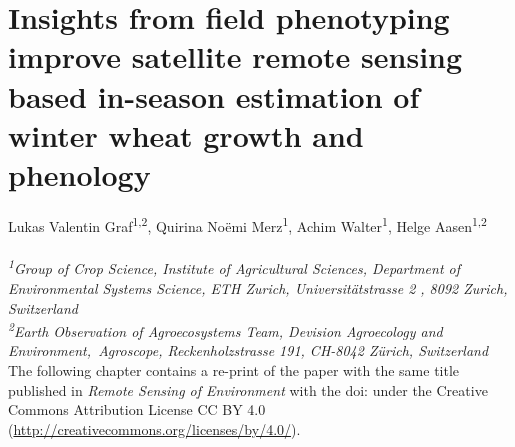 \chapter{Insights from field phenotyping improve satellite remote sensing based in-season estimation of winter wheat growth and phenology}
\label{chap:eodal}
\graphicspath{{./05-Insights/img}}

Lukas Valentin Graf\textsuperscript{1,2}, Quirina Noëmi Merz\textsuperscript{1}, Achim Walter\textsuperscript{1}, Helge Aasen\textsuperscript{1,2}
\\
\normalsize
\vspace{2pt}
\\
\textit{\textsuperscript{1}Group of Crop Science, Institute of Agricultural Sciences, Department of Environmental Systems Science, ETH Zurich, Universitätstrasse 2 , 8092 Zurich, Switzerland
\\
\textsuperscript{2}Earth Observation of Agroecosystems Team, Devision Agroecology and Environment,\ Agroscope, Reckenholzstrasse 191, CH-8042 Zürich, Switzerland
\vspace{2cm}}
\\

The following chapter contains a re-print of the paper with the same title published in \textsl{Remote Sensing of Environment} with the doi:  under the Creative Commons Attribution License CC BY 4.0 (\url{http://creativecommons.org/licenses/by/4.0/}).


